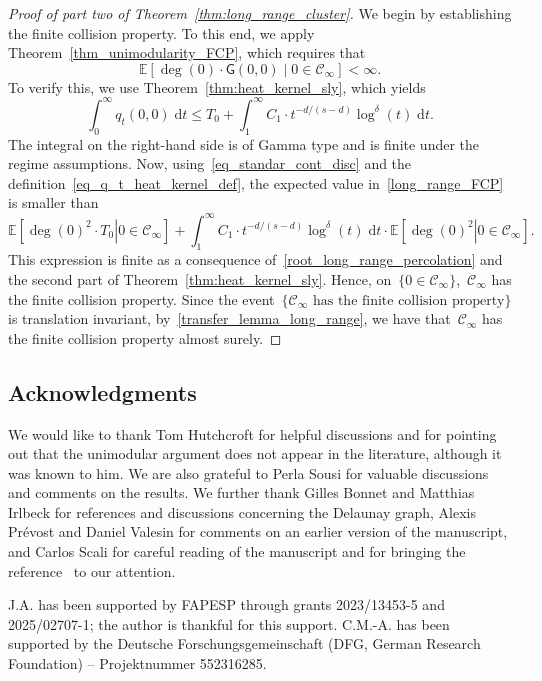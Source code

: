 \documentclass[a4paper,11pt]{article}
\newcommand{\EE}{\mathbb{E}}
\theoremstyle{definition}
\begin{document}
\begin{proof}[Proof of part two of Theorem~\ref{thm:long_range_cluster}] We begin by establishing the finite collision property. To this end, we apply Theorem~\ref{thm_unimodularity_FCP}, which requires that
\begin{equation}\label{long_range_FCP}
\EE[ \deg(0) \cdot \mathsf G(0,0) \mid 0 \in \mathcal C_\infty ] < \infty.
\end{equation}
To verify this, we use Theorem~\ref{thm:heat_kernel_sly}, which yields
$$  \int^\infty_0 q_t(0,0) \; \mathrm{d}t \leq T_0 + \int^\infty_1 C_1 \cdot t^{-d/(s-d)} \log^\delta(t) \; \mathrm{d}t. $$
The integral on the right-hand side is of Gamma type and is finite under the regime assumptions. Now, using~\eqref{eq_standar_cont_disc} and the definition~\eqref{eq_q_t_heat_kernel_def}, the expected value in~\eqref{long_range_FCP} is smaller than
$$ \left. \EE  \left[ \deg(0)^2 \cdot T_0 \right| 0 \in \mathcal C_\infty \right] + \int^\infty_1 C_1 \cdot t^{-d/(s-d)} \log^\delta(t) \; \mathrm{d}t \cdot \left. \EE  \left[ \deg(0)^2 \right| 0 \in \mathcal C_\infty \right].$$
This expression is finite as a consequence of~\eqref{root_long_range_percolation} and the second part of Theorem~\ref{thm:heat_kernel_sly}. Hence, on~$\{0 \in \mathcal C_\infty\}$,~$\mathcal C_\infty$  has the finite collision property. Since the event~$\{ \mathcal C_\infty \text{ has the finite collision property} \}$ is translation invariant, by~\eqref{transfer_lemma_long_range}, we have that~$\mathcal C_\infty$ has the finite collision property almost surely.
\end{proof}


\subsection*{Acknowledgments}
We would like to thank Tom Hutchcroft for helpful discussions and for pointing out that the unimodular argument does not appear in the literature, although it was known to him. We are also grateful to Perla Sousi for valuable discussions and comments on the results. We further thank Gilles Bonnet and Matthias Irlbeck for references and discussions concerning the Delaunay graph, Alexis Prévost and Daniel Valesin for comments on an earlier version of the manuscript, and Carlos Scali for careful reading of the manuscript and for bringing the reference~\cite{CanCroydonKumagai2022} to our attention. 

J.A. has been supported by FAPESP through grants 2023/13453-5 and 2025/02707-1; the author is thankful for this support. C.M.-A. has been supported by the Deutsche Forschungsgemeinschaft (DFG, German Research Foundation) – Projektnummer 552316285.


    
\end{document}
